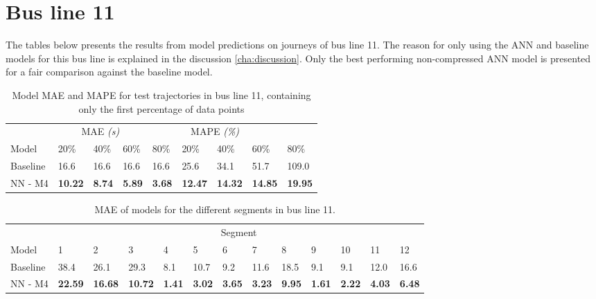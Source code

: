 \section{Bus line 11}
The tables below presents the results from model predictions on journeys of bus line 11. The reason for only using the ANN and baseline models for this bus line is explained in the discussion \ref{cha:discussion}. Only the best performing non-compressed ANN model is presented for a fair comparison against the baseline model.
\begin{table}[H]
	\centering
	\caption{Model MAE and MAPE for test trajectories in bus line 11, containing only the first percentage of data points}
	\label{tbl:models-mae-and-mape-211}
	\begin{tabular}{l | l | l | l | l || l | l | l | l }
		& \multicolumn{3}{c}{MAE \textit{(s)}} & \multicolumn{4}{c}{MAPE \textit{(\%)}} \\
		Model      & 20\% & 40\% & 60\% & 80\% & 20\% & 40\% & 60\% & 80\% \\
		\hline
		Baseline & 16.6 & 16.6 & 16.6 & 16.6  & 25.6 & 34.1 & 51.7 & 109.0 \\
		NN - M4        & \textbf{10.22}& \textbf{8.74}& \textbf{5.89}& \textbf{3.68}& \textbf{12.47}& \textbf{14.32}& \textbf{14.85}& \textbf{19.95} \\
	\end{tabular}
\end{table}

\begin{table}[H]
	\centering
	\caption{MAE of models for the different segments in bus line 11.}
	\label{tbl:model-mae-of-segs-211}
	\begin{adjustbox}{center}
	\begin{tabular}{ l | l | l | l | l | l | l | l | l | l | l | l | l}
		& \multicolumn{12}{c}{Segment} \\
		Model       & 1 & 2 & 3 & 4 & 5 & 6 & 7 & 8 & 9 & 10 & 11 & 12 \\
		\hline
		Baseline  & 38.4 & 26.1 & 29.3 & 8.1 & 10.7 & 9.2 & 11.6 & 18.5 & 9.1 & 9.1  & 12.0 & 16.6 \\
		NN - M4         & \textbf{22.59}& \textbf{16.68}& \textbf{10.72}& \textbf{1.41}& \textbf{3.02}& \textbf{3.65}& \textbf{3.23}& \textbf{9.95}& \textbf{1.61}& \textbf{2.22}& \textbf{4.03}& \textbf{6.48}\\
	\end{tabular}
	\end{adjustbox}
\end{table}

